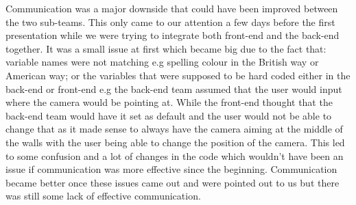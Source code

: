 \documentclass{article}
\begin{document}
	Communication was a major downside that could have been improved between the two sub-teams. This only came to our attention a few days before the first presentation while we were trying to integrate both front-end and the back-end together. It was a small issue at first which became big due to the fact that: variable names were not matching e.g spelling colour in the British way or American way; or the variables that were supposed to be hard coded either in the back-end or front-end e.g the back-end team assumed that the user would input where the camera would be pointing at. While the front-end thought that the back-end team would have it set as default and the user would not be able to change that as it made sense to always have the camera aiming at the middle of the walls with the user being able to change the position of the camera. This led to some confusion and a lot of changes in the code which wouldn't have been an issue if communication was more effective since the beginning. Communication became better once these issues came out and were pointed out to us but there was still some lack of effective communication.
	
	
	
	
	
	
	
	
	
	\clearpage
	
	
\end{document}

